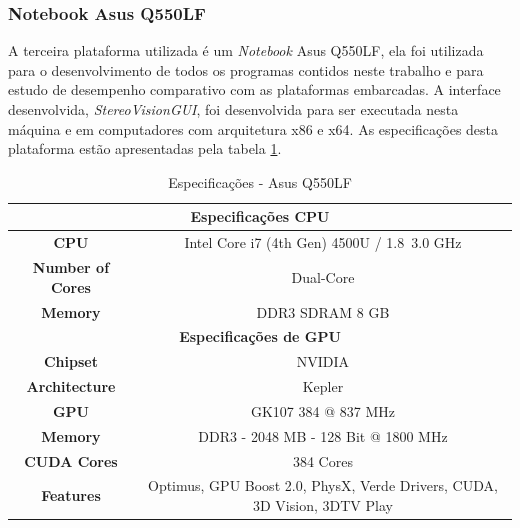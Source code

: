 \subsubsection{Notebook Asus Q550LF}

A terceira plataforma utilizada é um \textit{Notebook} Asus Q550LF, ela foi utilizada para o desenvolvimento de todos os programas contidos neste trabalho e para estudo de desempenho comparativo com as plataformas embarcadas. A interface desenvolvida, \textit{StereoVisionGUI}, foi desenvolvida para ser executada nesta máquina e em computadores com arquitetura x86 e x64. As especificações desta plataforma estão apresentadas pela tabela \ref{asusQ550LF}.

\begin{table}[]
\centering
\caption{Especificações - Asus Q550LF}
\label{asusQ550LF}
\begin{tabular}{|c|c|}
\hline
\multicolumn{2}{|c|}{\textbf{Especificações CPU}}                                                   \\ \hline
\textbf{CPU}             & Intel Core i7 (4th Gen) 4500U / 1.8~3.0 GHz                              \\ \hline
\textbf{Number of Cores} & Dual-Core                                                                \\ \hline
\textbf{Memory}          & DDR3 SDRAM 8 GB                                                          \\ \hline
\multicolumn{2}{|c|}{\textbf{Especificações de GPU}}                                                  \\ \hline
\textbf{Chipset}         & NVIDIA                                                                   \\ \hline
\textbf{Architecture}    & Kepler                                                                   \\ \hline
\textbf{GPU}             & GK107 384 @ 837 MHz                                                      \\ \hline
\textbf{Memory}          & DDR3 - 2048 MB - 128 Bit @ 1800 MHz                                      \\ \hline
\textbf{CUDA Cores}      & 384 Cores                                                                \\ \hline
\textbf{Features}        & Optimus, GPU Boost 2.0, PhysX, Verde Drivers, CUDA, 3D Vision, 3DTV Play \\ \hline
\end{tabular}
\end{table}



